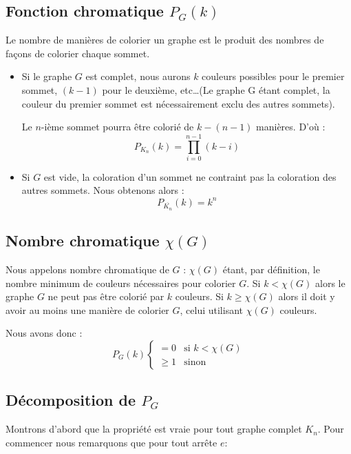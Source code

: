 \subsection{Fonction chromatique $P_G(k)$}
Le nombre de manières de colorier un graphe est le produit des nombres de façons de colorier chaque sommet.
\begin{itemize}
\item Si le graphe $G$ est complet, nous aurons $k$ couleurs possibles pour le premier sommet, $(k-1)$ pour le deuxième, etc\ldots (Le graphe G étant complet, la couleur du premier sommet est nécessairement exclu des autres sommets).

Le $n$-ième sommet pourra être colorié de $k-(n-1)$ manières. D'où :
\[ P_{K_n}(k)=\prod_{i=0}^{n-1}(k-i) \]

\item Si $G$ est vide, la coloration d'un sommet ne contraint pas la coloration des autres sommets. Nous obtenons alors :
\[ P_{\overline{K_n}}(k)=k^n \]
\end{itemize}

\subsection{Nombre chromatique $\chi(G)$}
Nous appelons \og nombre chromatique \fg de $G$ : $\chi(G)$ étant, par définition, le nombre minimum de couleurs nécessaires pour colorier $G$. Si $k < \chi(G)$ alors le graphe $G$ ne peut pas être colorié par $k$ couleurs. Si $k \geq \chi(G)$ alors il doit y avoir au moins une manière de colorier $G$, celui utilisant $\chi(G)$ couleurs.

Nous avons donc :
\begin{displaymath}
	P_G(k) \left\{ \begin{array}{ll}
	=0 & \textrm{si $k < \chi(G)$} \\
	\geq 1 & \textrm{sinon}
	\end{array} \right.
\end{displaymath}

\subsection{Décomposition de $P_G$}
Montrons d'abord que la propriété est vraie pour tout graphe complet $K_n$. Pour commencer nous remarquons que pour tout arrête $e$:


